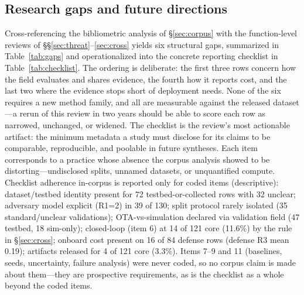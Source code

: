 \subsection{Research gaps and future directions}
\label{sec:gaps}
Cross-referencing the bibliometric analysis of \S\ref{sec:corpus} with the function-level reviews of \S\S\ref{sec:threat}--\ref{sec:cross} yields six structural gaps, summarized in Table~\ref{tab:gaps} and operationalized into the concrete reporting checklist in Table~\ref{tab:checklist}. The ordering is deliberate: the first three rows concern how the field evaluates and shares evidence, the fourth how it reports cost, and the last two where the evidence stops short of deployment needs. None of the six requires a new method family, and all are measurable against the released dataset---a rerun of this review in two years should be able to score each row as narrowed, unchanged, or widened. The checklist is the review's most actionable artifact: the minimum metadata a study must disclose for its claims to be comparable, reproducible, and poolable in future syntheses. Each item corresponds to a practice whose absence the corpus analysis showed to be distorting---undisclosed splits, unnamed datasets, or unquantified compute. Checklist adherence in-corpus is reported only for coded items (descriptive): dataset/testbed identity present for 72 testbed-or-collected rows with 32 unclear; adversary model explicit (R1=2) in 39 of 130; split protocol rarely isolated (35 standard/unclear validations); OTA-vs-simulation declared via validation field (47 testbed, 18 sim-only); closed-loop (item 6) at 14 of 121 core (11.6\%) by the rule in \S\ref{sec:cross}; onboard cost present on 16 of 84 defense rows (defense R3 mean 0.19); artifacts released for 4 of 121 core (3.3\%). Items 7--9 and 11 (baselines, seeds, uncertainty, failure analysis) were never coded, so no corpus claim is made about them---they are prospective requirements, as is the checklist as a whole beyond the coded items.
